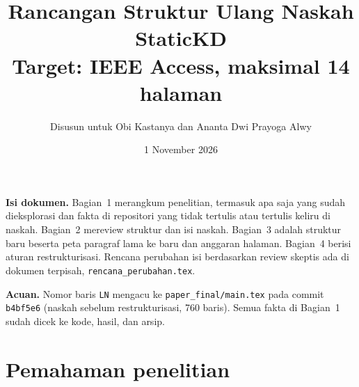 \documentclass[10pt,a4paper]{article}
\title{Rancangan Struktur Ulang Naskah StaticKD\\\large Target: IEEE Access, maksimal 14 halaman}
\author{Disusun untuk Obi Kastanya dan Ananta Dwi Prayoga Alwy}
\date{1 November 2026}
\newcommand{\old}[1]{\texttt{L#1}}
\begin{document}
\maketitle

\noindent\textbf{Isi dokumen.} Bagian~1 merangkum penelitian, termasuk apa saja yang sudah dieksplorasi dan fakta di repositori yang tidak tertulis atau tertulis keliru di naskah. Bagian~2 mereview struktur dan isi naskah. Bagian~3 adalah struktur baru beserta peta paragraf lama ke baru dan anggaran halaman. Bagian~4 berisi aturan restrukturisasi. Rencana perubahan isi berdasarkan review skeptis ada di dokumen terpisah, \texttt{rencana\_perubahan.tex}.

\noindent\textbf{Acuan.} Nomor baris \old{N} mengacu ke \texttt{paper\_final/main.tex} pada commit \texttt{b4bf5e6} (naskah sebelum restrukturisasi, 760 baris). Semua fakta di Bagian~1 sudah dicek ke kode, hasil, dan arsip.

\section{Pemahaman penelitian}
\end{document}
